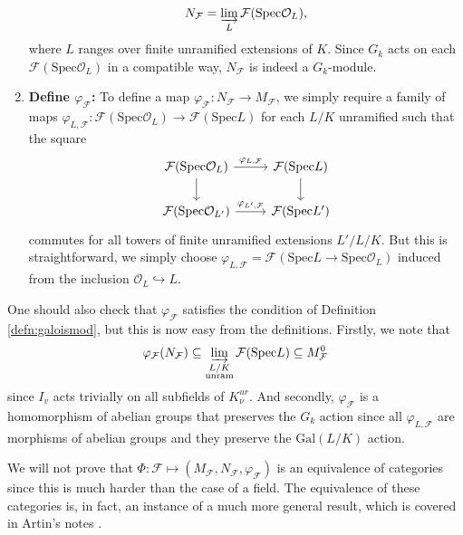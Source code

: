 \documentclass{article}
\newcommand{\Spec}{\mathrm{Spec}}
\newcommand{\Gal}{\mathrm{Gal}}
\theoremstyle{plain}
\theoremstyle{definition}
\begin{document}
\begin{enumerate}[(1)]
        $$N_\mathcal{F}=\varinjlim_{L}\mathcal{F}(\Spec\mathcal{O}_L),$$
        where $L$ ranges over finite unramified extensions of $K$. Since $G_k$ acts on each $\mathcal{F}(\Spec\mathcal{O}_L)$ in a compatible way, $N_\mathcal{F}$ is indeed a $G_k$-module.
        \item \textbf{Define $\varphi_\mathcal{F}$:} To define a map $\varphi_\mathcal{F}:N_\mathcal{F}\to M_\mathcal{F}$, we simply require a family of maps $\varphi_{L,\mathcal{F}}:\mathcal{F}(\Spec\mathcal{O}_L)\to\mathcal{F}(\Spec L)$ for each $L/K$ unramified such that the square 
        \[
            \begin{tikzcd}
                \mathcal{F}(\Spec\mathcal{O}_L) \arrow[r,"\varphi_{L,\mathcal{F}}"] \arrow[d,""] & \mathcal{F}(\Spec L) \arrow[d,""] \\
                \mathcal{F}(\Spec\mathcal{O}_{L'}) \arrow[r,"\varphi_{L',\mathcal{F}}"] & \mathcal{F}(\Spec L')
            \end{tikzcd}
        \]
        commutes for all towers of finite unramified extensions $L'/L/K$. But this is straightforward, we simply choose $\varphi_{L,\mathcal{F}}=\mathcal{F}(\Spec L\to\Spec\mathcal{O}_L)$ induced from the inclusion $\mathcal{O}_L\hookrightarrow L$. 
    \end{enumerate}
    One should also check that $\varphi_\mathcal{F}$ satisfies the condition of Definition \ref{defn:galoismod}, but this is now easy from the definitions. Firstly, we note that 
    $$\varphi_\mathcal{F}(N_\mathcal{F})\subseteq\varinjlim_{\substack{L/K\\\text{unram}}}\mathcal{F}(\Spec L)\subseteq M_\mathcal{F}^{0}$$
    since $I_v$ acts trivially on all subfields of $K^{ur}_\nu$. And secondly, $\varphi_\mathcal{F}$ is a homomorphism of abelian groups that preserves the $G_k$ action since all $\varphi_{L,\mathcal{F}}$ are morphisms of abelian groups and they preserve the $\Gal(L/K)$ action. 

    We will not prove that $\Phi:\mathcal{F}\mapsto(M_\mathcal{F},N_\mathcal{F},\varphi_\mathcal{F})$ is an equivalence of categories since this is much harder than the case of a field. The equivalence of these categories is, in fact, an instance of a much more general result, which is covered in Artin's notes \cite[\S3 Corollary 2.5]{Artin}.
\end{document}
